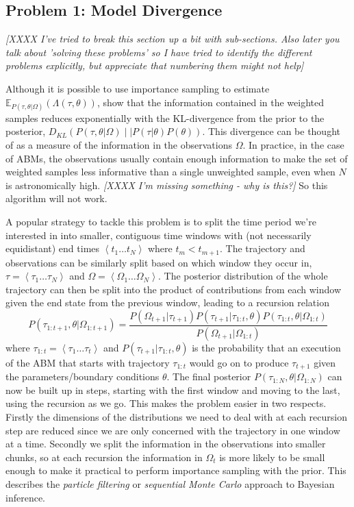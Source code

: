 \documentclass{article}
\begin{document}
\subsection{Problem 1: Model Divergence}

\textit{[XXXX I've tried to break this section up a bit with sub-sections. Also later you talk about 'solving these problems' so I have tried to identify the different problems explicitly, but appreciate that numbering them might not help]}

Although it is possible to use importance sampling to estimate $\mathbb{E}_{P(\tau,\theta|\Omega)}(\Lambda(\tau,\theta))$, \citet{chatterjee2018sample} show that the information contained in the weighted samples reduces exponentially with the KL-divergence from the prior to the posterior, $D_{KL}\left(P(\tau,\theta|\Omega) \mid\mid P(\tau|\theta)P(\theta) \right)$. This divergence can be thought of as a measure of the information in the observations $\Omega$. In practice, in the case of ABMs, the observations usually contain enough information to make the set of weighted samples less informative than a single unweighted sample, even when $N$ is astronomically high. \textit{[XXXX I'm missing something - why is this?]} So this algorithm will not work.

A popular strategy to tackle this problem is to split the time period we're interested in into smaller, contiguous time windows with (not necessarily equidistant) end times $\left<t_1 \dots t_N\right>$ where $t_m < t_{m+1}$. The trajectory and observations can be similarly split based on which window they occur in, $\tau = \left<\tau_1 \dots \tau_N\right>$ and $\Omega = \left<\Omega_1 \dots \Omega_N\right>$. The posterior distribution of the whole trajectory can then be split into the product of contributions from each window given the end state from the previous window, leading to a recursion relation
\begin{equation}
P\left(\tau_{1:t+1}, \theta | \Omega_{1:t+1}\right)
=
\frac{ P(\Omega_{t+1}|\tau_{t+1})
P(\tau_{t+1}|\tau_{1:t},\theta) P\left(\tau_{1:t},\theta| \Omega_{1:t}\right)
}
{	P(\Omega_{t+1}| \Omega_{1:t}) }
\label{bayesrecursion}
\end{equation}
where $\tau_{1:t} = \left<\tau_1 \dots \tau_t\right>$ and $P(\tau_{t+1}|\tau_{1:t},\theta)$ is the probability that an execution of the ABM that starts with trajectory $\tau_{1:t}$ would go on to produce $\tau_{t+1}$ given the parameters/boundary conditions $\theta$. The final posterior $P(\tau_{1:N},\theta|\Omega_{1:N})$ can now be built up in steps, starting with the first window and moving to the last, using the recursion as we go. This makes the problem easier in two respects. Firstly the dimensions of the distributions we need to deal with at each recursion step are reduced since we are only concerned with the trajectory in one window at a time. Secondly we split the information in the observations into smaller chunks, so at each recursion the information in $\Omega_t$ is more likely to be small enough to make it practical to perform importance sampling with the prior. This describes the \textit{particle filtering} or \textit{sequential Monte Carlo} approach to Bayesian inference.
\end{document}

